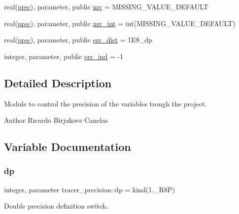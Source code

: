 \begin{DoxyCompactItemize}
real(\mbox{\hyperlink{namespacetracer__precision_a8a01094f67c69ab389329d205a7c4cc6}{prec}}), parameter, public \mbox{\hyperlink{namespacetracer__precision_a783785f78c8f38be24eef86ccd426c6e}{mv}} = M\+I\+S\+S\+I\+N\+G\+\_\+\+V\+A\+L\+U\+E\+\_\+\+D\+E\+F\+A\+U\+LT
\item 
real(\mbox{\hyperlink{namespacetracer__precision_a8a01094f67c69ab389329d205a7c4cc6}{prec}}), parameter, public \mbox{\hyperlink{namespacetracer__precision_abddd3613902872af708334a2c29dc468}{mv\+\_\+int}} = int(M\+I\+S\+S\+I\+N\+G\+\_\+\+V\+A\+L\+U\+E\+\_\+\+D\+E\+F\+A\+U\+LT)
\item 
real(\mbox{\hyperlink{namespacetracer__precision_a8a01094f67c69ab389329d205a7c4cc6}{prec}}), parameter, public \mbox{\hyperlink{namespacetracer__precision_ac58a793d67c36de01068a6315cb0211f}{err\+\_\+dist}} = 1\+E8\+\_\+dp
\item 
integer, parameter, public \mbox{\hyperlink{namespacetracer__precision_a8a4267e1aa9cc99d32b65d07cb31cb2a}{err\+\_\+ind}} = -\/1
\end{DoxyCompactItemize}


\subsection{Detailed Description}
Module to control the precision of the variables trough the project. 

\begin{DoxyAuthor}{Author}
Ricardo Birjukovs Canelas 
\end{DoxyAuthor}


\subsection{Variable Documentation}
\mbox{\label{namespacetracer__precision_a21febe1c6d584cd6b7995a7abc568efb}} 
\subsubsection{\texorpdfstring{dp}{dp}}
{\footnotesize\ttfamily integer, parameter tracer\+\_\+precision\+::dp = kind(1.\+\_\+\+R8P)\hspace{0.3cm}{\ttfamily [private]}}



Double precision definition switch. 

